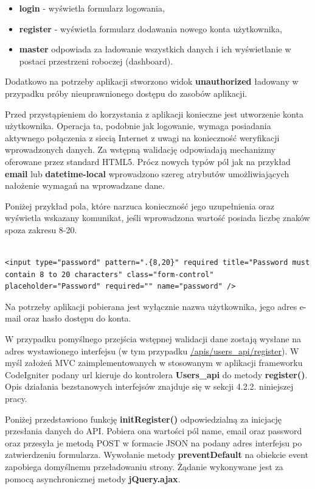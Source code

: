 \begin{itemize}
\item \textbf{login} - wyświetla formularz logowania,
\item \textbf{register} - wyświetla formularz dodawania nowego konta użytkownika,
\item \textbf{master} odpowiada za ładowanie wszystkich danych i ich wyświetlanie w postaci przestrzeni roboczej (dashboard).
\end{itemize}

Dodatkowo na potrzeby aplikacji stworzono widok \textbf{unauthorized} ładowany w przypadku próby nieuprawnionego dostępu do zasobów aplikacji.

Przed przystąpieniem do korzystania z aplikacji konieczne jest utworzenie konta użytkownika. Operacja ta, podobnie jak logowanie, wymaga posiadania aktywnego połączenia z siecią Internet z uwagi na konieczność weryfikacji wprowadzonych danych. Za wstępną walidację odpowiadają mechanizmy oferowane przez standard HTML5. Prócz nowych typów pól jak na przykład \textbf{email} lub \textbf{datetime-local} wprowadzono szereg atrybutów umożliwiających nałożenie wymagań na wprowadzane dane.

Poniżej przykład pola, które narzuca konieczność jego uzupełnienia oraz wyświetla wskazany komunikat, jeśli wprowadzona wartość posiada liczbę znaków spoza zakresu 8-20.

\begin{lstlisting}[caption=Przykład pola "hasło" w widoku rejestracji., label=amb, captionpos=b]

<input type="password" pattern=".{8,20}" required title="Password must contain 8 to 20 characters" class="form-control" placeholder="Password" required="" name="password" />

\end{lstlisting}

Na potrzeby aplikacji pobierana jest wyłącznie nazwa użytkownika, jego adres e-mail oraz hasło dostępu do konta.

W przypadku pomyślnego przejścia wstępnej walidacji dane zostają wysłane na adres wystawionego interfejsu (w tym przypadku \url{/apis/users_api/register}). W myśl założeń MVC zaimplementowanych w stosowanym w aplikacji frameworku CodeIgniter podany url kieruje do kontrolera \textbf{Users\_api} do metody \textbf{register()}. Opis działania bezstanowych interfejsów znajduje się w sekcji 4.2.2. niniejszej pracy.

Poniżej przedstawiono funkcję \textbf{initRegister()} odpowiedzialną za inicjację przesłania danych do API. Pobiera ona wartości pól name, email oraz password oraz przesyła je metodą POST w formacie JSON na podany adres interfejsu po zatwierdzeniu formularza. Wywołanie metody \textbf{preventDefault} na obiekcie event zapobiega domyślnemu przeładowaniu strony. Żądanie wykonywane jest za pomocą asynchronicznej metody \textbf{jQuery.ajax}.

